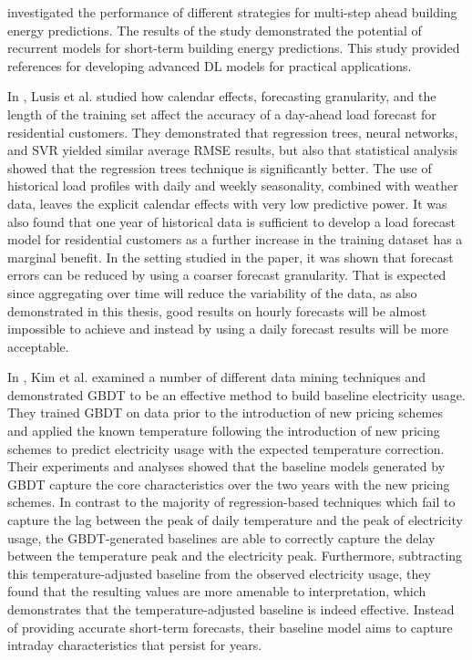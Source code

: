 \cite{FAN2019700} investigated the performance of different strategies for multi-step ahead building energy predictions.
The results of the study demonstrated the potential of recurrent models for short-term building energy predictions.
This study provided references for developing advanced DL models for practical applications.

In \cite{LUSIS2017654}, Lusis et al. studied how calendar effects, forecasting granularity, and the length of the training set affect the accuracy of a day-ahead load forecast for residential customers.
They demonstrated that regression trees, neural networks, and SVR yielded similar average RMSE results, but also that statistical analysis showed that the regression trees technique is significantly better.
The use of historical load profiles with daily and weekly seasonality, combined with weather data, leaves the explicit calendar effects with very low predictive power.
It was also found that one year of historical data is sufficient to develop a load forecast model for residential customers as a further increase in the training dataset has a marginal benefit.
In the setting studied in the paper, it was shown that forecast errors can be reduced by using a coarser forecast granularity.
That is expected since aggregating over time will reduce the variability of the data, as also demonstrated in this thesis, good results on hourly forecasts will be almost impossible to achieve and instead by using a daily forecast results will be more acceptable.

In \cite{7463810}, Kim et al. examined a number of different data mining techniques and demonstrated GBDT to be an effective method to build baseline electricity usage.
They trained GBDT on data prior to the introduction of new pricing schemes and applied the known temperature following the introduction of new pricing schemes to predict electricity usage with the expected temperature correction.
Their experiments and analyses showed that the baseline models generated by GBDT capture the core characteristics over the two years with the new pricing schemes.
In contrast to the majority of regression-based techniques which fail to capture the lag between the peak of daily temperature and the peak of electricity usage, the GBDT-generated baselines are able to correctly capture the delay between the temperature peak and the electricity peak.
Furthermore, subtracting this temperature-adjusted baseline from the observed electricity usage, they found that the resulting values are more amenable to interpretation, which demonstrates that the temperature-adjusted baseline is indeed effective.
Instead of providing accurate short-term forecasts, their baseline model aims to capture intraday characteristics that persist for years.

